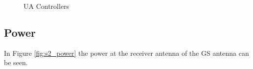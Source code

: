 \begin{figure}[H]
	\hfill
	\hfill
	\caption{UA Controllers}
	\label{fig:s1_gs}
\end{figure}

\subsection{Power}
In Figure \ref{fig:s2_power} the power at the receiver antenna of the GS antenna can be seen.


